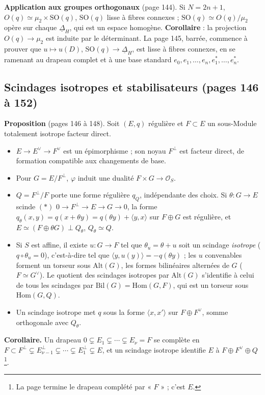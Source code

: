 \documentclass[11pt,a4paper]{article}
\begin{document}
\textbf{Application aux groupes orthogonaux} (page 144). Si $N = 2n + 1$, $O(q) \simeq
\mu_2 \times \mathrm{SO}(q)$, $\mathrm{SO}(q)$ lisse à fibres connexes ; $\mathrm{SO}(q)
\simeq O(q)/\mu_2$ opère sur chaque $\underline{\Delta}_H$, qui est un espace homogène.
\textbf{Corollaire} : la projection $O(q) \to \mu_2$ est induite par le déterminant. La
page 145, barrée, commence à prouver que $u \mapsto u(D)$, $\mathrm{SO}(q) \to
\underline{\Delta}_H$, est lisse à fibres connexes, en se ramenant au drapeau complet et
à une base standard $e_0, e_1, \ldots, e_n, e_1^{*}, \ldots, e_n^{*}$.

\subsection*{Scindages isotropes et stabilisateurs (pages 146 à 152)}

\textbf{Proposition} (pages 146 à 148). Soit $(E, q)$ régulière et $F \subset E$ un
sous-Module totalement isotrope facteur direct.
\begin{itemize}
  \item[a)] $E \to E^{\vee} \to F^{\vee}$ est un épimorphisme ; son noyau $F^{\perp}$
    est facteur direct, de formation compatible aux changements de base.
  \item[b)] Pour $G = E/F^{\perp}$, $\varphi$ induit une dualité $F \times G \to
    \mathcal{O}_S$.
  \item[c)] $Q = F^{\perp}/F$ porte une forme régulière $q_Q$, indépendante des choix. Si
    $\theta : G \to E$ scinde $(*)$ $0 \to F^{\perp} \to E \to G \to 0$, la forme $q_\theta(x,
    y) = q(x + \theta y) = q(\theta y) + \langle y, x\rangle$ sur $F \oplus G$ est
    régulière, et $E \simeq (F \oplus \theta G) \perp Q_\theta$, $Q_\theta \simeq Q$.
  \item[d)] Si $S$ est affine, il existe $u : G \to F$ tel que $\theta_u = \theta + u$
    soit un scindage \emph{isotrope} ($q \circ \theta_u = 0$), c'est-à-dire tel que
    $\langle y, u(y)\rangle = -q(\theta y)$ ; les $u$ convenables forment un torseur sous
    $\mathrm{Alt}(G)$, les formes bilinéaires alternées de $G$ ($F \simeq G^{\vee}$). Le
    quotient des scindages isotropes par $\mathrm{Alt}(G)$ s'identifie à celui de tous
    les scindages par $\mathrm{Bil}(G) = \mathrm{Hom}(G, F)$, qui est un torseur sous
    $\mathrm{Hom}(G, Q)$.
  \item[e)] Un scindage isotrope met $q$ sous la forme $\langle x, x'\rangle$ sur $F
    \oplus F^{\vee}$, somme orthogonale avec $Q_\theta$.
\end{itemize}
\textbf{Corollaire.} Un drapeau $0 \subsetneq E_1 \subsetneq \cdots \subsetneq E_\nu =
F$ se complète en $F \subset F^{\perp} \subsetneq E_{\nu - 1}^{\perp} \subsetneq \cdots
\subsetneq E_1^{\perp} \subsetneq E$, et un scindage isotrope identifie $E$ à $F \oplus
F^{\vee} \oplus Q$\footnote{La page termine le drapeau complété par « $F$ » ; c'est
$E$.}.
\end{document}
